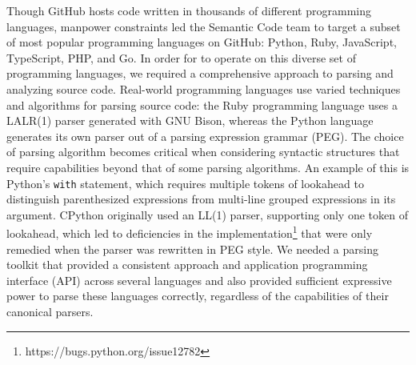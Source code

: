 \documentclass[acmsmall,fleqn,12pt]{acmart}
\begin{document}
Though GitHub hosts code written in thousands of different programming
languages, manpower constraints led the Semantic Code team to target a subset of
most popular programming languages on GitHub: Python, Ruby, JavaScript,
TypeScript, PHP, and Go. In order for \semantic{} to operate on this diverse set
of programming languages, we required a comprehensive approach to parsing and
analyzing source code. Real-world programming languages use varied techniques
and algorithms for parsing source code: the Ruby programming language uses a
LALR(1) parser generated with GNU Bison, whereas the Python language generates
its own parser out of a parsing expression grammar (PEG). The choice of parsing
algorithm becomes critical when considering syntactic structures that require
capabilities beyond that of some parsing algorithms. An example of this is
Python’s \texttt{with} statement, which requires multiple tokens of lookahead to
distinguish parenthesized expressions from multi-line grouped expressions in its
argument. CPython originally used an LL(1) parser, supporting only one token of
lookahead, which led to deficiencies in the
implementation\footnote{https://bugs.python.org/issue12782} that were only
remedied when the parser was rewritten in PEG style. We needed a parsing toolkit
that provided a consistent approach and application programming interface (API)
across several languages and also provided sufficient expressive power to parse
these languages correctly, regardless of the capabilities of their canonical
parsers.
\end{document}
